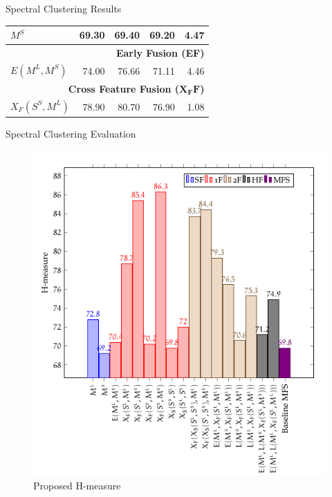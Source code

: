 \documentclass[10pt,=table]{beamer}
\newcommand\mlex{M^{\scriptscriptstyle L}}
\newcommand\msyn{M^{\scriptscriptstyle S}}
\newcommand\ssyn{S^{\scriptscriptstyle S}}
\begin{document}
\begin{frame}{Spectral Clustering Results}
\begin{overprint}
\begin{minipage}[c][.8\textheight][c]{\linewidth}
\begin{tabular}{@{}lrrrr@{}}
		 	$\msyn$                    &	69.30	& 69.40 & 69.20 & 4.47\\
		    \midrule 
		    \multicolumn{5}{r}{\textbf{Early Fusion (EF)}} \\ %
   			\rowcolor{orangeEric!70} 
		    $E(\mlex, \msyn)$		&	{74.00}	& 76.66 & {71.11} & 4.46\\
			\midrule \midrule
	       \multicolumn{5}{r}{\textbf{Cross Feature Fusion ($\mathbf{X_FF}$)}}       \\
 		   \rowcolor{greenEric!70} 
       	   $X_F(\ssyn, \mlex)$		&	{78.90}	& 80.70 & {76.90}	 & 1.08 \\	   	         
       	   \bottomrule
			\end{tabular}		
		\end{minipage}
	
	\end{overprint}


	
\end{frame}



\begin{frame}{Spectral Clustering Evaluation}
\begin{figure}
	\centering
	\includegraphics[width=.6\linewidth]{image2/Chapitre4/wsd_SC_Hm.png}
	\caption{Proposed H-measure}
\end{figure}
\end{frame}
\end{document}
